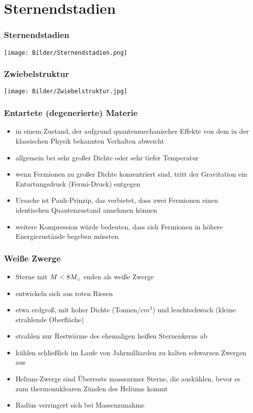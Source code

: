 \documentclass{beamer}
\begin{document}
\section{Sternendstadien}

\begin{frame}
  \frametitle{Sternendstadien}

\centering
\texttt{[image: Bilder/Sternendstadien.png]}

\end{frame}

\begin{frame}
  \frametitle{Zwiebelstruktur}

\centering
\texttt{[image: Bilder/Zwiebelstruktur.jpg]}

\end{frame}

\begin{frame}\frametitle{Entartete (degenerierte) Materie}

\begin{itemize}
\item in einem Zustand, der aufgrund quantenmechanischer Effekte von dem in der klassischen Physik bekannten Verhalten abweicht
\item allgemein bei sehr großer Dichte oder sehr tiefer Temperatur
\item wenn Fermionen zu großer Dichte konzentriert sind, tritt der Gravitation ein Entartungsdruck (Fermi-Druck) entgegen
\item Ursache ist Pauli-Prinzip, das verbietet, dass zwei Fermionen einen identischen Quantenzustand annehmen können \item weitere Kompression würde bedeuten, dass sich Fermionen in höhere Energiezustände begeben müssten
\end{itemize}

\end{frame}

\begin{frame}\frametitle{Weiße Zwerge}

\begin{itemize}
\item Sterne mit $M < 8 M_{\tiny \astrosun}$ enden als weiße Zwerge
\item entwickeln sich aus roten Riesen
\item etwa erdgroß, mit hoher Dichte (Tonnen/$cm^3$) und leuchtschwach (kleine strahlende Oberfläche)
\item strahlen nur Restwärme des ehemaligen heißen Sternenkerns ab
\item kühlen schließlich im Laufe von Jahrmilliarden zu kalten schwarzen Zwergen aus
\item Helium-Zwerge sind Überreste massearmer Sterne, die auskühlen, bevor es zum thermonuklearen Zünden des Heliums kommt 
\item Radius verringert sich bei Massenzunahme
\end{itemize}

\end{frame}
\end{document}
